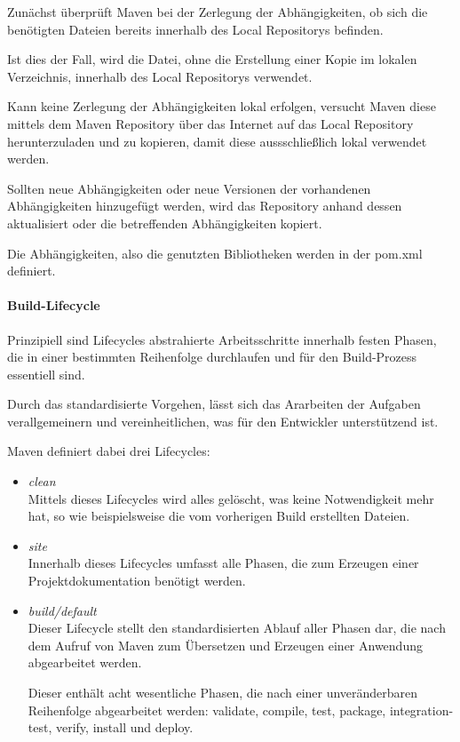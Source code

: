 Zunächst überprüft Maven bei der Zerlegung der Abhängigkeiten, ob sich die benötigten Dateien bereits innerhalb des Local Repositorys befinden. \cite[S. 45 - 47]{loukides_maven_2008} 

Ist dies der Fall, wird die Datei, ohne die Erstellung einer Kopie im lokalen Verzeichnis, innerhalb des Local Repositorys verwendet.

Kann keine Zerlegung der Abhängigkeiten lokal erfolgen, versucht Maven diese mittels dem Maven Repository über das Internet auf das Local Repository herunterzuladen und zu kopieren, damit diese aussschließlich lokal verwendet werden. \cite[S. 115]{spiller_maven_2011}   

Sollten neue Abhängigkeiten oder neue Versionen der vorhandenen Abhängigkeiten hinzugefügt werden, wird das Repository anhand dessen aktualisiert oder die betreffenden Abhängigkeiten kopiert. 

Die Abhängigkeiten, also die genutzten Bibliotheken werden in der pom.xml definiert. 

\paragraph{Build-Lifecycle}

Prinzipiell sind Lifecycles abstrahierte Arbeitsschritte innerhalb festen Phasen, die in einer bestimmten Reihenfolge durchlaufen und für den Build-Prozess essentiell sind. \cite[S. 57]{varanasi_introducing_2019}  

Durch das standardisierte Vorgehen, lässt sich das Ararbeiten der Aufgaben verallgemeinern und vereinheitlichen, was für den Entwickler unterstützend ist.

Maven definiert dabei drei Lifecycles\cite[S. 72 - 76]{spiller_maven_2011}: 

\begin{itemize}
    \item \textit{clean}\\
    Mittels dieses Lifecycles wird alles gelöscht, was keine Notwendigkeit mehr hat, so wie beispielsweise die vom vorherigen Build erstellten Dateien. 

    \item \textit{site}\\
    Innerhalb dieses Lifecycles umfasst alle Phasen, die zum Erzeugen einer Projektdokumentation benötigt werden.
    
    \item \textit{build/default}\\
    Dieser Lifecycle stellt den standardisierten Ablauf aller Phasen dar, die nach dem Aufruf von Maven zum Übersetzen und Erzeugen einer Anwendung abgearbeitet werden. 
    
    Dieser enthält acht wesentliche Phasen, die nach einer unveränderbaren Reihenfolge abgearbeitet werden: validate, compile, test, package, integration-test, verify, install und deploy.  

\end{itemize}

